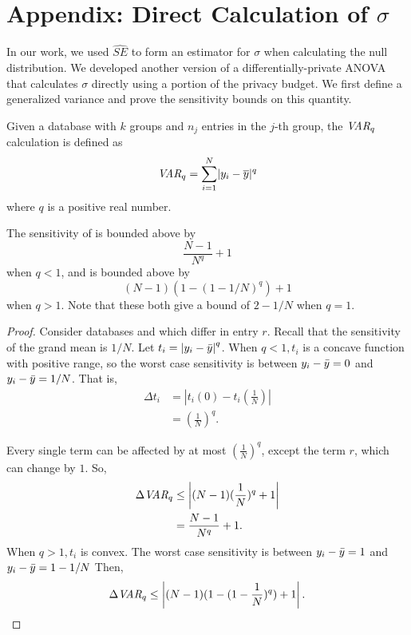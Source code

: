 
\section{Appendix: Direct Calculation of $\sigma$}
\label{Sec:AppDirSig}

In our work, we used $\widehat{SE}$ to form an estimator for $\sigma$ when calculating the null distribution.  We developed another version of a differentially-private ANOVA that calculates $\sigma$ directly using a portion of the privacy budget.  We first define a generalized variance and prove the sensitivity bounds on this quantity.

\begin{definition}[$\var_q$] \label{def:varq} Given a database \x with $k$ groups and $n_j$ entries in the $j$-th group, the $\var_q$ calculation is defined as
\begin{equation*}
\textit{VAR}_q = \sum_{i=1}^N \lvert y_{i} - \overline{y} \rvert^q
\end{equation*}
where $q$ is a positive real number.
\end{definition}

\begin{theorem} \label{thm:varqSens} 
The sensitivity of \varq is bounded above by
$$ \frac{N-1}{N^q} + 1 $$
when $q<1$, and is bounded above by
$$ (N-1)(1-(1-1/N)^q) + 1 $$
when $q>1$. Note that these both give a bound of $2-1/N$ when $q=1$.
\end{theorem}

\begin{proof}
Consider databases \x and \xprime which differ in entry $r$. Recall that the sensitivity of the grand mean is $1/N$. Let $t_i = \left\vert  y_i - \bar{y} \right\vert ^q$. When $q<1, t_i$ is a concave function with positive range, so the worst case sensitivity is between $ y_i - \bar{y} = 0$ and $ y_i - \bar{y} = 1/N$. That is, 
\begin{align*}
\Delta t_i &= \left\vert t_{i}(0) - t_i\left(\frac{1}{N}\right) \right\vert \\
	&= \left( \frac{1}{N} \right)^q.
\end{align*}

Every single term can be affected by at most $\left( \frac{1}{N} \right)^q$, except the term $r$, which can change by $1$. So, 
\begin{align*}
\Delta \textit{VAR}_q &\le \left\vert (N-1)(\frac{1}{N})^q + 1 \right\vert \\
	&= \frac{N-1}{N^q} + 1.
\end{align*}
%
When $q>1, t_i$ is convex. The worst case sensitivity is between  $y_i - \bar{y} = 1$ and $y_i - \bar{y} = 1-1/N$ Then,
\begin{align*}
\Delta \textit{VAR}_q \le \left\vert (N-1)(1-(1-\frac{1}{N})^q) + 1 \right\vert.
\end{align*}
\end{proof}

